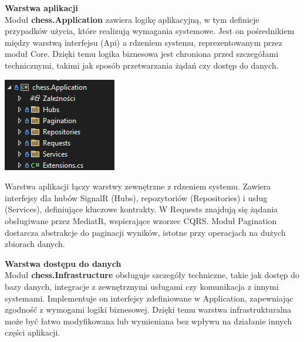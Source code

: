 \documentclass[12pt,a4paper]{article}
\begin{document}
\noindent \textbf{Warstwa aplikacji}\\
Moduł \textbf{chess.Application} zawiera logikę aplikacyjną, w tym definicje przypadków użycia, które realizują wymagania systemowe. Jest on pośrednikiem między warstwą interfejsu (Api) a rdzeniem systemu, reprezentowanym przez moduł Core. Dzięki temu logika biznesowa jest chroniona przed szczegółami technicznymi, takimi jak sposób przetwarzania żądań czy dostęp do danych.

\vspace{0.5cm}
\begin{minipage}[t]{0.45\textwidth}
    \vspace{0pt}
    \centering
    \includegraphics[width=\linewidth]{images/struktura_back_application.png} 
\end{minipage}
\hfill
\begin{minipage}[t]{0.45\textwidth}
    \vspace{0pt}
    \raggedright
    Warstwa aplikacji łączy warstwy zewnętrzne z rdzeniem systemu. Zawiera interfejsy dla hubów SignalR (Hubs), repozytoriów (Repositories) i usług (Services), definiujące kluczowe kontrakty. W Requests znajdują się żądania obsługiwane przez MediatR, wspierające wzorzec CQRS. Moduł Pagination dostarcza abstrakcje do paginacji wyników, istotne przy operacjach na dużych zbiorach danych.
\end{minipage}

\newpage

\noindent \textbf{Warstwa dostępu do danych}\\
Moduł \textbf{chess.Infrastructure} obsługuje szczegóły techniczne, takie jak dostęp do bazy danych, integracje z zewnętrznymi usługami czy komunikacja z innymi systemami. Implementuje on interfejsy zdefiniowane w Application, zapewniając zgodność z wymogami logiki biznesowej. Dzięki temu warstwa infrastrukturalna może być łatwo modyfikowana lub wymieniana bez wpływu na działanie innych części aplikacji.
\end{document}
